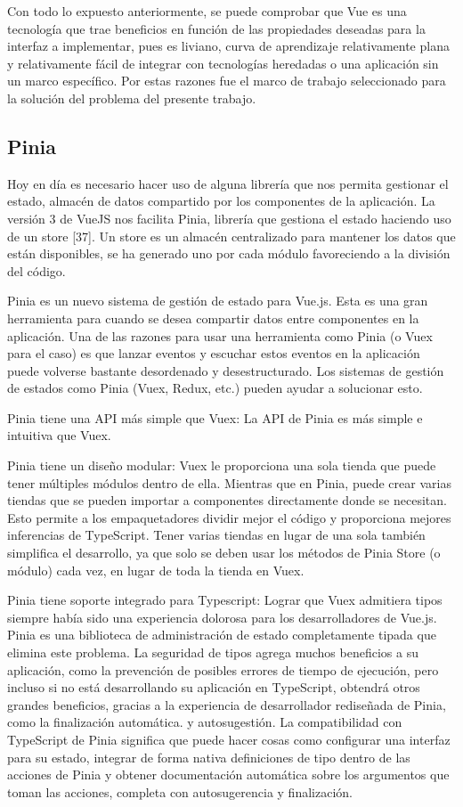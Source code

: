 Con todo lo expuesto anteriormente, se puede comprobar que Vue es una tecnología que trae beneficios en función de las propiedades deseadas para la interfaz a implementar, pues es liviano, curva de aprendizaje relativamente plana y relativamente fácil de integrar con tecnologías heredadas o una aplicación sin un marco específico. Por estas razones fue el marco de trabajo seleccionado para la solución del problema del presente trabajo.

\subsection{Pinia}

Hoy en día es necesario hacer uso de alguna librería que nos permita gestionar el estado, almacén de datos compartido por los componentes de la aplicación. La versión 3 de VueJS nos facilita Pinia, librería que gestiona el estado haciendo uso de un store [37]. Un store es un almacén centralizado para mantener los datos que están disponibles, se ha generado uno por cada módulo favoreciendo a la división del código.

Pinia es un nuevo sistema de gestión de estado para Vue.js. Esta es una gran herramienta para cuando se desea compartir datos entre componentes en la aplicación. Una de las razones para usar una herramienta como Pinia (o Vuex para el caso) es que lanzar eventos y escuchar estos eventos en la aplicación puede volverse bastante desordenado y desestructurado. Los sistemas de gestión de estados como Pinia (Vuex, Redux, etc.) pueden ayudar a solucionar esto.

Pinia tiene una API más simple que Vuex: La API de Pinia es más simple e intuitiva que Vuex.

Pinia tiene un diseño modular: Vuex le proporciona una sola tienda que puede tener múltiples módulos dentro de ella. Mientras que en Pinia, puede crear varias tiendas que se pueden importar a componentes directamente donde se necesitan. Esto permite a los empaquetadores dividir mejor el código y proporciona mejores inferencias de TypeScript.
Tener varias tiendas en lugar de una sola también simplifica el desarrollo, ya que solo se deben usar los métodos de Pinia Store (o módulo) cada vez, en lugar de toda la tienda en Vuex.

Pinia tiene soporte integrado para Typescript: Lograr que Vuex admitiera tipos siempre había sido una experiencia dolorosa para los desarrolladores de Vue.js. Pinia es una biblioteca de administración de estado completamente tipada que elimina este problema. La seguridad de tipos agrega muchos beneficios a su aplicación, como la prevención de posibles errores de tiempo de ejecución, pero incluso si no está desarrollando su aplicación en TypeScript, obtendrá otros grandes beneficios, gracias a la experiencia de desarrollador rediseñada de Pinia, como la finalización automática. y autosugestión.
La compatibilidad con TypeScript de Pinia significa que puede hacer cosas como configurar una interfaz para su estado, integrar de forma nativa definiciones de tipo dentro de las acciones de Pinia y obtener documentación automática sobre los argumentos que toman las acciones, completa con autosugerencia y finalización.


